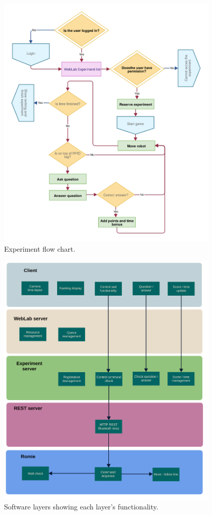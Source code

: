\clearpage
\begin{figure}
	\centering
	\includegraphics[width=0.95\textwidth]{fig/experiment-flow}
	\caption{Experiment flow chart.}
	\label{fig:exp_flow}
\end{figure}

\clearpage
\begin{figure}
	\centering
	\includegraphics[width=0.95\textwidth]{fig/layers}
	\caption{Software layers showing each layer's functionality.}
	\label{fig:layers}
\end{figure}
\clearpage

